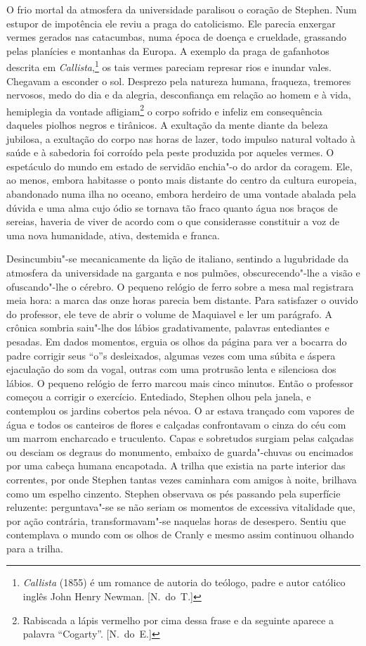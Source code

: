 O frio mortal da atmosfera da universidade paralisou o coração de Stephen.  Num
estupor de impotência ele reviu a praga do catolicismo.  Ele parecia enxergar
vermes gerados nas catacumbas, numa época de doença e crueldade, grassando
pelas planícies e montanhas da Europa.  A exemplo da praga de gafanhotos
descrita em \textit{Callista},\footnote{ \textit{Callista} (1855) é um romance
de autoria do teólogo, padre e autor católico inglês John Henry Newman. [N.~do~T.]}
os tais vermes pareciam represar rios e inundar vales.  Chegavam a esconder
o sol.  Desprezo pela natureza humana, fraqueza, tremores
nervosos, medo do dia e da alegria, desconfiança em relação ao homem e à vida,
hemiplegia da vontade afligiam\footnote{ Rabiscada a lápis vermelho por cima
dessa frase e da seguinte aparece a palavra “Cogarty”. [N.~do~E.]} o corpo
sofrido e infeliz em consequência daqueles piolhos negros e tirânicos.  A
exultação da mente diante da beleza jubilosa, a exultação do corpo nas horas de
lazer, todo impulso natural voltado à saúde e à sabedoria foi corroído pela
peste produzida por aqueles vermes.  O espetáculo do mundo em estado de
servidão enchia"-o do ardor da coragem.  Ele, ao menos, embora habitasse o ponto
mais distante do centro da cultura europeia, abandonado numa ilha no oceano,
embora herdeiro de uma vontade abalada pela dúvida e uma alma cujo ódio se
tornava tão fraco quanto água nos braços de sereias, haveria de viver de acordo
com o que considerasse constituir a voz de uma nova humanidade, ativa,
destemida e franca.

Desincumbiu"-se mecanicamente da lição de italiano, sentindo a lugubridade da
atmosfera da universidade na garganta e nos pulmões, obscurecendo"-lhe a visão e
ofuscando"-lhe o cérebro.  O pequeno relógio de ferro sobre a mesa mal
registrara meia hora: a marca das onze horas parecia bem distante.  Para
satisfazer o ouvido do professor, ele teve de abrir o volume de Maquiavel e ler
um parágrafo.  A crônica sombria saiu"-lhe dos lábios gradativamente, palavras
entediantes e pesadas.  Em dados momentos, erguia os olhos da página para ver a
bocarra do padre corrigir seus “o”s desleixados, algumas vezes com uma súbita e
áspera ejaculação do som da vogal, outras com uma protrusão lenta e silenciosa
dos lábios.  O pequeno relógio de ferro marcou mais cinco minutos.  Então o
professor começou a corrigir o exercício.  \label{entediado"-stephen} Entediado, Stephen olhou pela
janela, e contemplou os jardins cobertos pela névoa.  O ar estava trançado com
vapores de água e todos os canteiros de flores e calçadas confrontavam o cinza
do céu com um marrom encharcado e truculento.  Capas e sobretudos surgiam pelas
calçadas ou desciam os degraus do monumento, embaixo de guarda"-chuvas ou
encimados por uma cabeça humana encapotada.  A trilha que existia na parte
interior das correntes, por onde Stephen tantas vezes caminhara com amigos à
noite, brilhava como um espelho cinzento.  Stephen observava os pés passando
pela superfície reluzente: perguntava"-se se não seriam os momentos de excessiva
vitalidade que, por ação contrária, transformavam"-se naquelas horas de
desespero.  Sentiu que contemplava o mundo com os olhos de Cranly e mesmo assim
continuou olhando para a trilha.

